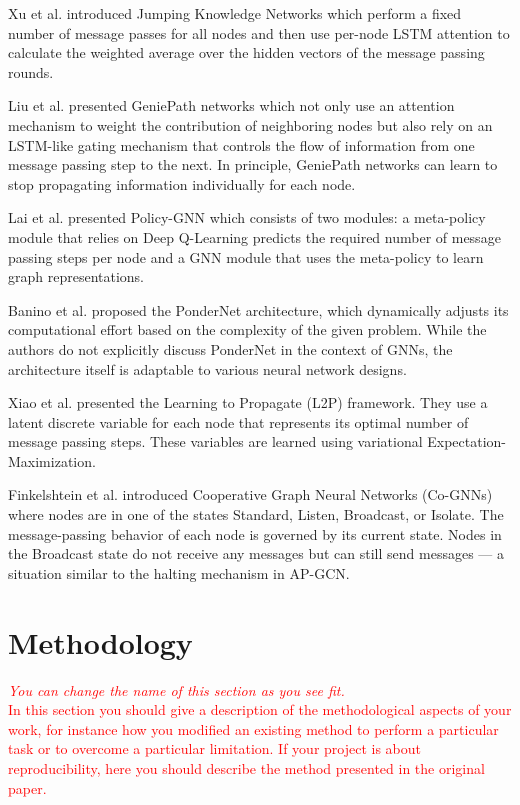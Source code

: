 \documentclass{gdl}
\begin{document}
Xu et al. \cite{xu2018} introduced Jumping Knowledge Networks which perform a fixed number of message passes for all nodes and then use per-node LSTM attention to calculate the weighted average over the hidden vectors of the message passing rounds.   

Liu et al. \cite{liu2019} presented GeniePath networks which not only use an attention mechanism to weight the contribution of neighboring nodes but also rely on an LSTM-like gating mechanism that controls the flow of information from one message passing step to the next. In principle, GeniePath networks can learn to stop propagating information individually for each node.

Lai et al. \cite{lai2020} presented Policy-GNN which consists of two modules: a meta-policy module that relies on Deep Q-Learning predicts the required number of message passing steps per node and a GNN module that uses the meta-policy to learn graph representations.

Banino et al. \cite{banino2021} proposed the PonderNet architecture, which dynamically adjusts its computational effort based on the complexity of the given problem. While the authors do not explicitly discuss PonderNet in the context of GNNs, the architecture itself is adaptable to various neural network designs.

Xiao et al. \cite{xiao2021} presented the Learning to Propagate (L2P) framework. They use a latent discrete variable for each node that represents its optimal number of message passing steps. These variables are learned using variational Expectation-Maximization.

Finkelshtein et al. \cite{finkelshtein2024} introduced Cooperative Graph Neural Networks (Co-GNNs) where nodes are in one of the states Standard, Listen, Broadcast, or Isolate. The message-passing behavior of each node is governed by its current state. Nodes in the Broadcast state do not receive any messages but can still send messages — a situation similar to the halting mechanism in AP-GCN.

\section{Methodology}

\textcolor{red}{
\textit{You can change the name of this section as you see fit.}\\
In this section you should give a description of the methodological aspects of your work, for instance how you modified an existing method to perform a particular task or to overcome a particular limitation. If your project is about reproducibility, here you should describe the method presented in the original paper.}
\end{document}
